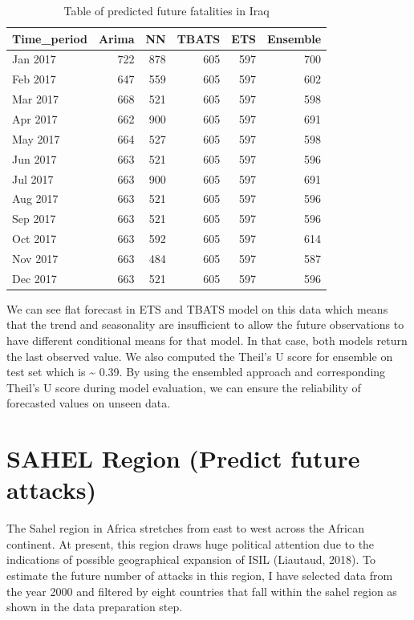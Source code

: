 \documentclass[11pt,oneside,a4paper]{reedthesis}
\begin{document}
\begin{table}[H]

\caption{\label{tab:unnamed-chunk-102}Table of predicted future fatalities in Iraq}
\centering
\fontsize{12}{14}\selectfont
\begin{tabular}[t]{lrrrrr}
\toprule
Time\_period & Arima & NN & TBATS & ETS & Ensemble\\
\midrule
Jan 2017 & 722 & 878 & 605 & 597 & 700\\
Feb 2017 & 647 & 559 & 605 & 597 & 602\\
Mar 2017 & 668 & 521 & 605 & 597 & 598\\
Apr 2017 & 662 & 900 & 605 & 597 & 691\\
May 2017 & 664 & 527 & 605 & 597 & 598\\
\addlinespace
Jun 2017 & 663 & 521 & 605 & 597 & 596\\
Jul 2017 & 663 & 900 & 605 & 597 & 691\\
Aug 2017 & 663 & 521 & 605 & 597 & 596\\
Sep 2017 & 663 & 521 & 605 & 597 & 596\\
Oct 2017 & 663 & 592 & 605 & 597 & 614\\
\addlinespace
Nov 2017 & 663 & 484 & 605 & 597 & 587\\
Dec 2017 & 663 & 521 & 605 & 597 & 596\\
\bottomrule
\end{tabular}
\end{table}
We can see flat forecast in ETS and TBATS model on this data which means
that the trend and seasonality are insufficient to allow the future
observations to have different conditional means for that model. In that
case, both models return the last observed value. We also computed the
Theil's U score for ensemble on test set which is \textasciitilde{}
0.39. By using the ensembled approach and corresponding Theil's U score
during model evaluation, we can ensure the reliability of forecasted
values on unseen data.

\section{SAHEL Region (Predict future
attacks)}\label{sahel-region-predict-future-attacks}

The Sahel region in Africa stretches from east to west across the
African continent. At present, this region draws huge political
attention due to the indications of possible geographical expansion of
ISIL (Liautaud, 2018). To estimate the future number of attacks in this
region, I have selected data from the year 2000 and filtered by eight
countries that fall within the sahel region as shown in the data
preparation step.
\end{document}
